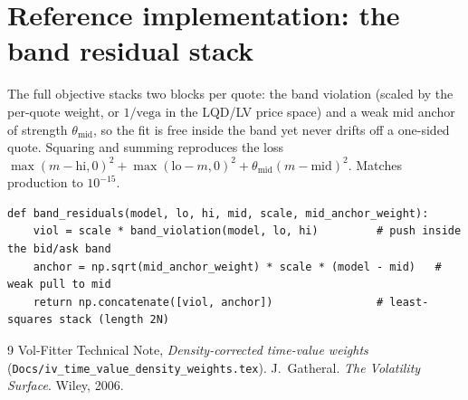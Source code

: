 \documentclass[11pt]{article}
\begin{document}
\section{Reference implementation: the band residual stack}
\label{app:ref}

The full objective stacks two blocks per quote: the band violation (scaled by the
per-quote weight, or $1/\text{vega}$ in the LQD/LV price space) and a weak mid
anchor of strength $\theta_{\text{mid}}$, so the fit is free inside the band yet
never drifts off a one-sided quote. Squaring and summing reproduces the loss
$\max(m-\text{hi},0)^2+\max(\text{lo}-m,0)^2+\theta_{\text{mid}}(m-\text{mid})^2$.
Matches production to $10^{-15}$.

\begin{lstlisting}[caption={The stacked band-objective residual (distilled from
\texttt{calib/band.py}).}]
def band_residuals(model, lo, hi, mid, scale, mid_anchor_weight):
    viol = scale * band_violation(model, lo, hi)         # push inside the bid/ask band
    anchor = np.sqrt(mid_anchor_weight) * scale * (model - mid)   # weak pull to mid
    return np.concatenate([viol, anchor])                # least-squares stack (length 2N)
\end{lstlisting}

\begin{thebibliography}{9}
 Vol-Fitter Technical Note, \emph{Density-corrected time-value
weights} (\texttt{Docs/iv\_time\_value\_density\_weights.tex}).
 J.~Gatheral. \emph{The Volatility Surface}. Wiley, 2006.
\end{thebibliography}
\end{document}
